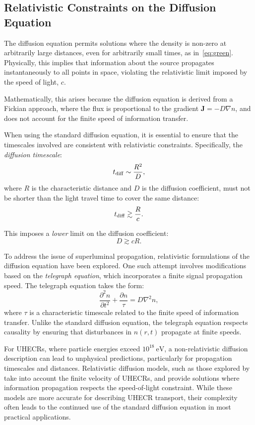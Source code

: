 \subsection{Relativistic Constraints on the Diffusion Equation }

The diffusion equation permits solutions where the density is non-zero at arbitrarily large distances, even for arbitrarily small times, as in~\cref{eq:green}. 
%
Physically, this implies that information about the source propagates instantaneously to all points in space, violating the relativistic limit imposed by the speed of light, \(c\).  

Mathematically, this arises because the diffusion equation is derived from a Fickian approach, where the flux is proportional to the gradient \( \mathbf{J} = -D \nabla n \), and does not account for the finite speed of information transfer.  

When using the standard diffusion equation, it is essential to ensure that the timescales involved are consistent with relativistic constraints. Specifically, the \emph{diffusion timescale}:  
\[
t_{\rm diff} \sim \frac{R^2}{D},
\]
where \(R\) is the characteristic distance and \(D\) is the diffusion coefficient, must not be shorter than the light travel time to cover the same distance:
\[
t_{\rm diff} \gtrsim \frac{R}{c}.
\]

This imposes a \emph{lower} limit on the diffusion coefficient:
\[
D \gtrsim c R.
\]

To address the issue of superluminal propagation, relativistic formulations of the diffusion equation have been explored. One such attempt involves modifications based on the \emph{telegraph equation}, which incorporates a finite signal propagation speed. The telegraph equation takes the form:
\[
\frac{\partial^2 n}{\partial t^2} + \frac{\partial n}{\tau} = D \nabla^2 n,
\]
where \(\tau\) is a characteristic timescale related to the finite speed of information transfer. Unlike the standard diffusion equation, the telegraph equation respects causality by ensuring that disturbances in \( n(r, t)\) propagate at finite speeds.  

For UHECRs, where particle energies exceed \(10^{18}~\text{eV}\), a non-relativistic diffusion description can lead to unphysical predictions, particularly for propagation timescales and distances. Relativistic diffusion models, such as those explored by~\cite{Berezinskii2012} take into account the finite velocity of UHECRs,  and provide solutions where information propagation respects the speed-of-light constraint.  
%
While these models are more accurate for describing UHECR transport, their complexity often leads to the continued use of the standard diffusion equation in most practical applications.  

